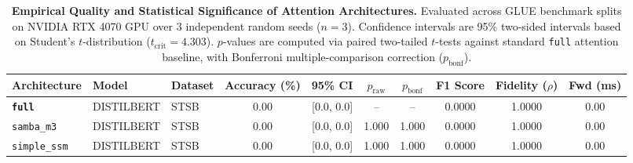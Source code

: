 \begin{table}[t]
\centering
\small
\caption{\textbf{Empirical Quality and Statistical Significance of Attention Architectures.} Evaluated across GLUE benchmark splits on NVIDIA RTX 4070 GPU over 3 independent random seeds ($n=3$). Confidence intervals are 95\% two-sided intervals based on Student's $t$-distribution ($t_{\text{crit}}=4.303$). $p$-values are computed via paired two-tailed $t$-tests against standard \texttt{full} attention baseline, with Bonferroni multiple-comparison correction ($p_{\text{bonf}}$).}
\label{tab:quality_benchmark_results}
\begin{tabular}{l l l c c c c c c c}
\toprule
\textbf{Architecture} & \textbf{Model} & \textbf{Dataset} & \textbf{Accuracy (\%)} & \textbf{95\% CI} & \textbf{$p_{\text{raw}}$} & \textbf{$p_{\text{bonf}}$} & \textbf{F1 Score} & \textbf{Fidelity ($\rho$)} & \textbf{Fwd (ms)} \\
\midrule
\textbf{\texttt{full}} & DISTILBERT & STSB & 0.00 & [0.0, 0.0] & -- & -- & 0.0000 & 1.0000 & 0.00 \\
\texttt{samba\_m3} & DISTILBERT & STSB & 0.00 & [0.0, 0.0] & 1.000 & 1.000 & 0.0000 & 1.0000 & 0.00 \\
\texttt{simple\_ssm} & DISTILBERT & STSB & 0.00 & [0.0, 0.0] & 1.000 & 1.000 & 0.0000 & 1.0000 & 0.00 \\
\bottomrule
\end{tabular}
\end{table}